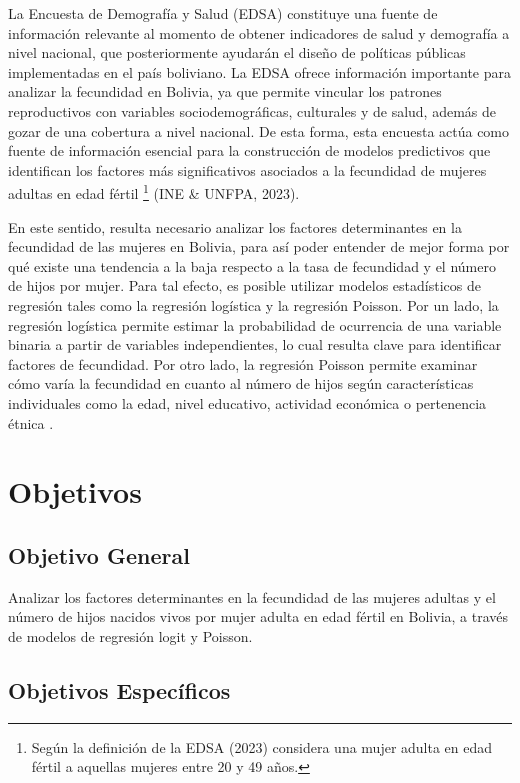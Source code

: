 \documentclass[Royal,times,sageh]{sagej}
\begin{document}
La Encuesta de Demografía y Salud (EDSA) constituye una fuente de
información relevante al momento de obtener indicadores de salud y
demografía a nivel nacional, que posteriormente ayudarán el diseño de
políticas públicas implementadas en el país boliviano. La EDSA ofrece
información importante para analizar la fecundidad en Bolivia, ya que
permite vincular los patrones reproductivos con variables
sociodemográficas, culturales y de salud, además de gozar de una
cobertura a nivel nacional. De esta forma, esta encuesta actúa como
fuente de información esencial para la construcción de modelos
predictivos que identifican los factores más significativos asociados a
la fecundidad de mujeres adultas en edad fértil \footnote{Según la
  definición de la EDSA (2023) considera una mujer adulta en edad fértil
  a aquellas mujeres entre 20 y 49 años.} (INE \& UNFPA, 2023).

En este sentido, resulta necesario analizar los factores determinantes
en la fecundidad de las mujeres en Bolivia, para así poder entender de
mejor forma por qué existe una tendencia a la baja respecto a la tasa de
fecundidad y el número de hijos por mujer. Para tal efecto, es posible
utilizar modelos estadísticos de regresión tales como la regresión
logística y la regresión Poisson. Por un lado, la regresión logística
permite estimar la probabilidad de ocurrencia de una variable binaria a
partir de variables independientes, lo cual resulta clave para
identificar factores de fecundidad. Por otro lado, la regresión Poisson
permite examinar cómo varía la fecundidad en cuanto al número de hijos
según características individuales como la edad, nivel educativo,
actividad económica o pertenencia étnica \citep{schultz2006fertility}.

\section{Objetivos}\label{objetivos}

\subsection{Objetivo General}\label{objetivo-general}

Analizar los factores determinantes en la fecundidad de las mujeres
adultas y el número de hijos nacidos vivos por mujer adulta en edad
fértil en Bolivia, a través de modelos de regresión logit y Poisson.

\subsection{Objetivos Específicos}\label{objetivos-especuxedficos}
\end{document}
